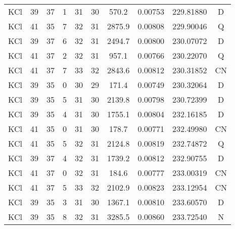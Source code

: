 \begin{table*}[htp]
\begin{tabular}{cccccccccc}
KCl & 39 & 37 & 1 & 31 & 30 & 570.2 & 0.00753 & 229.81880 & D \\
KCl & 41 & 35 & 7 & 32 & 31 & 2875.9 & 0.00808 & 229.90046 & Q \\
KCl & 39 & 37 & 6 & 32 & 31 & 2494.7 & 0.00800 & 230.07072 & D \\
KCl & 41 & 37 & 2 & 32 & 31 & 957.1 & 0.00766 & 230.22070 & Q \\
KCl & 41 & 37 & 7 & 33 & 32 & 2843.6 & 0.00812 & 230.31852 & CN \\
KCl & 39 & 35 & 0 & 30 & 29 & 171.4 & 0.00749 & 230.32064 & D \\
KCl & 39 & 35 & 5 & 31 & 30 & 2139.8 & 0.00798 & 230.72399 & D \\
KCl & 39 & 35 & 4 & 31 & 30 & 1755.1 & 0.00804 & 232.16185 & D \\
KCl & 41 & 35 & 0 & 31 & 30 & 178.7 & 0.00771 & 232.49980 & CN \\
KCl & 41 & 35 & 5 & 32 & 31 & 2124.8 & 0.00819 & 232.74872 & Q \\
KCl & 39 & 37 & 4 & 32 & 31 & 1739.2 & 0.00812 & 232.90755 & D \\
KCl & 41 & 37 & 0 & 32 & 31 & 184.6 & 0.00777 & 233.00319 & CN \\
KCl & 41 & 37 & 5 & 33 & 32 & 2102.9 & 0.00823 & 233.12954 & CN \\
KCl & 39 & 35 & 3 & 31 & 30 & 1367.1 & 0.00810 & 233.60570 & D \\
KCl & 39 & 35 & 8 & 32 & 31 & 3285.5 & 0.00860 & 233.72540 & N \\
\hline
\end{tabular}

\par 
\end{table*}
